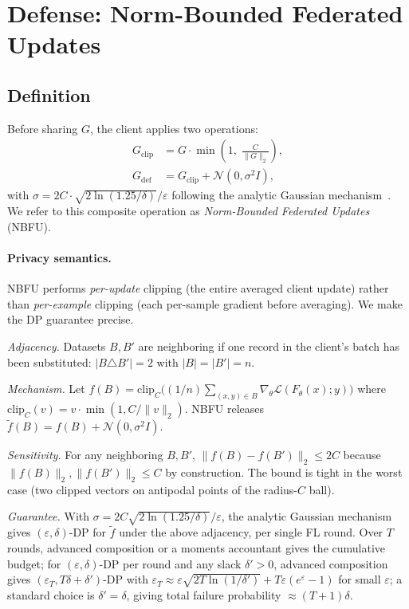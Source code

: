 \documentclass[11pt]{article}
\begin{document}
\section{Defense: Norm-Bounded Federated Updates}
\label{sec:method}

\subsection{Definition}
Before sharing $G$, the client applies two operations:
\begin{align}
G_{\text{clip}} &= G \cdot \min\!\left(1,\; \frac{C}{\|G\|_2}\right), \label{eq:clip}\\
G_{\text{def}} &= G_{\text{clip}} + \mathcal{N}(0, \sigma^2 I), \label{eq:noise}
\end{align}
with $\sigma = 2C \cdot \sqrt{2 \ln(1.25/\delta)} / \varepsilon$ following the analytic Gaussian mechanism~\citep{gaussianmechanism2018}. We refer to this composite operation as \emph{Norm-Bounded Federated Updates} (NBFU).

\paragraph{Privacy semantics.}
NBFU performs \emph{per-update} clipping (the entire averaged client update) rather than \emph{per-example} clipping (each per-sample gradient before averaging). We make the DP guarantee precise.

\emph{Adjacency.} Datasets $B, B'$ are neighboring if one record in the client's batch has been substituted: $|B \triangle B'| = 2$ with $|B| = |B'| = n$.

\emph{Mechanism.} Let $f(B) = \mathrm{clip}_C\!\big((1/n)\sum_{(x,y)\in B} \nabla_\theta \mathcal{L}(F_\theta(x); y)\big)$ where $\mathrm{clip}_C(v) = v \cdot \min(1, C/\|v\|_2)$. NBFU releases $\tilde f(B) = f(B) + \mathcal{N}(0, \sigma^2 I)$.

\emph{Sensitivity.} For any neighboring $B, B'$, $\|f(B) - f(B')\|_2 \le 2C$ because $\|f(B)\|_2, \|f(B')\|_2 \le C$ by construction. The bound is tight in the worst case (two clipped vectors on antipodal points of the radius-$C$ ball).

\emph{Guarantee.} With $\sigma = 2C\sqrt{2 \ln(1.25/\delta)} / \varepsilon$, the analytic Gaussian mechanism~\citep{gaussianmechanism2018} gives $(\varepsilon, \delta)$-DP for $\tilde f$ under the above adjacency, per single FL round. Over $T$ rounds, advanced composition or a moments accountant gives the cumulative budget; for $(\varepsilon,\delta)$-DP per round and any slack $\delta'>0$, advanced composition~\citep[Theorem 3.20]{differentialprivacy2014} gives $(\varepsilon_T, T\delta + \delta')$-DP with $\varepsilon_T \approx \varepsilon\sqrt{2T\ln(1/\delta')} + T\varepsilon(e^\varepsilon - 1)$ for small $\varepsilon$; a standard choice is $\delta'{=}\delta$, giving total failure probability $\approx (T{+}1)\delta$.
\end{document}
